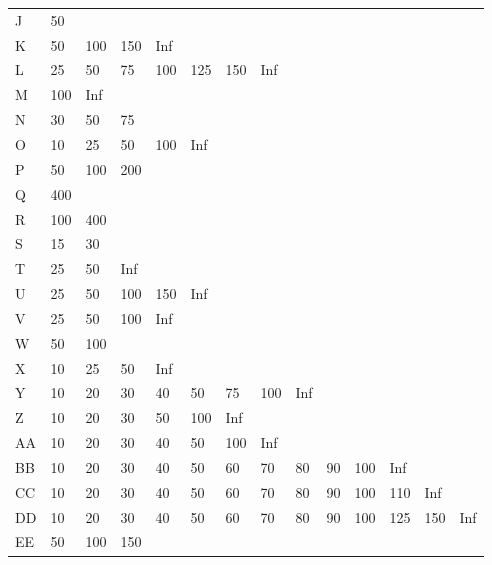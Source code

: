 \begin{table}[]
\begin{tabular}{l|lllllllllllll}
		J      & 50  &     &     &     &     &     &     &     &    &     &     &     &     \\
		K      & 50  & 100 & 150 & Inf &     &     &     &     &    &     &     &     &     \\
		L      & 25  & 50  & 75  & 100 & 125 & 150 & Inf &     &    &     &     &     &     \\
		M      & 100 & Inf &     &     &     &     &     &     &    &     &     &     &     \\
		N      & 30  & 50  & 75  &     &     &     &     &     &    &     &     &     &     \\
		O      & 10  & 25  & 50  & 100 & Inf &     &     &     &    &     &     &     &     \\
		P      & 50  & 100 & 200 &     &     &     &     &     &    &     &     &     &     \\
		Q      & 400 &     &     &     &     &     &     &     &    &     &     &     &     \\
		R      & 100 & 400 &     &     &     &     &     &     &    &     &     &     &     \\
		S      & 15  & 30  &     &     &     &     &     &     &    &     &     &     &     \\
		T      & 25  & 50  & Inf &     &     &     &     &     &    &     &     &     &     \\
		U      & 25  & 50  & 100 & 150 & Inf &     &     &     &    &     &     &     &     \\
		V      & 25  & 50  & 100 & Inf &     &     &     &     &    &     &     &     &     \\
		W      & 50  & 100 &     &     &     &     &     &     &    &     &     &     &     \\
		X      & 10  & 25  & 50  & Inf &     &     &     &     &    &     &     &     &     \\
		Y      & 10  & 20  & 30  & 40  & 50  & 75  & 100 & Inf &    &     &     &     &     \\
		Z      & 10  & 20  & 30  & 50  & 100 & Inf &     &     &    &     &     &     &     \\
		AA     & 10  & 20  & 30  & 40  & 50  & 100 & Inf &     &    &     &     &     &     \\
		BB     & 10  & 20  & 30  & 40  & 50  & 60  & 70  & 80  & 90 & 100 & Inf &     &     \\
		CC     & 10  & 20  & 30  & 40  & 50  & 60  & 70  & 80  & 90 & 100 & 110 & Inf &     \\
		DD     & 10  & 20  & 30  & 40  & 50  & 60  & 70  & 80  & 90 & 100 & 125 & 150 & Inf \\
		EE     & 50  & 100 & 150 &     &     &     &     &     &    &     &     &     &    
	\end{tabular}
\end{table}


